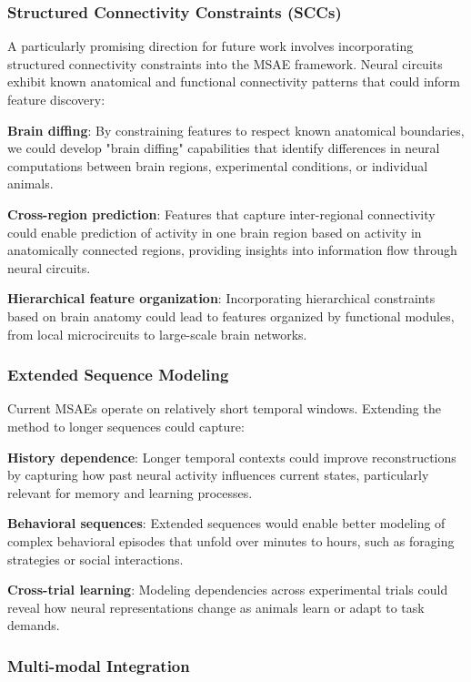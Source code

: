 \subsubsection{Structured Connectivity Constraints (SCCs)}

A particularly promising direction for future work involves incorporating structured connectivity constraints into the MSAE framework. Neural circuits exhibit known anatomical and functional connectivity patterns that could inform feature discovery:

\textbf{Brain diffing}: By constraining features to respect known anatomical boundaries, we could develop "brain diffing" capabilities that identify differences in neural computations between brain regions, experimental conditions, or individual animals.

\textbf{Cross-region prediction}: Features that capture inter-regional connectivity could enable prediction of activity in one brain region based on activity in anatomically connected regions, providing insights into information flow through neural circuits.

\textbf{Hierarchical feature organization}: Incorporating hierarchical constraints based on brain anatomy could lead to features organized by functional modules, from local microcircuits to large-scale brain networks.

\subsubsection{Extended Sequence Modeling}

Current MSAEs operate on relatively short temporal windows. Extending the method to longer sequences could capture:

\textbf{History dependence}: Longer temporal contexts could improve reconstructions by capturing how past neural activity influences current states, particularly relevant for memory and learning processes.

\textbf{Behavioral sequences}: Extended sequences would enable better modeling of complex behavioral episodes that unfold over minutes to hours, such as foraging strategies or social interactions.

\textbf{Cross-trial learning}: Modeling dependencies across experimental trials could reveal how neural representations change as animals learn or adapt to task demands.

\subsubsection{Multi-modal Integration}

